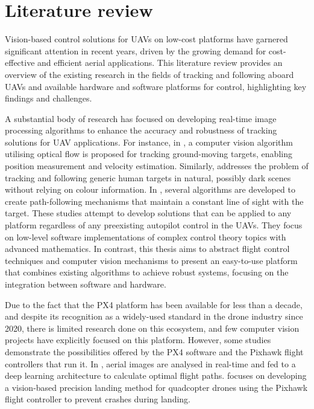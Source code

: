 \section{Literature review}
\label{sec:lit-review}



Vision-based control solutions for UAVs on low-cost platforms have garnered significant attention in recent years, driven by the growing demand for cost-effective and efficient aerial applications. This literature review provides an overview of the existing research in the fields of tracking and following aboard UAVs and available hardware and software platforms for control, highlighting key findings and challenges.

A substantial body of research has focused on developing real-time image processing algorithms to enhance the accuracy and robustness of tracking solutions for UAV applications. For instance, in \cite{gomez-balderas2012}, a computer vision algorithm utilising optical flow is proposed for tracking ground-moving targets, enabling position measurement and velocity estimation. Similarly, \cite{bevilacqua2016} addresses the problem of tracking and following generic human targets in natural, possibly dark scenes without relying on colour information. In \cite{rysdyk2003}, several algorithms are developed to create path-following mechanisms that maintain a constant line of sight with the target. These studies attempt to develop solutions that can be applied to any platform regardless of any preexisting autopilot control in the UAVs.
They focus on low-level software implementations of complex control theory topics with advanced mathematics.
In contrast, this thesis aims to abstract flight control techniques and computer vision mechanisms to present an easy-to-use platform that combines existing algorithms to achieve robust systems, focusing on the integration between software and hardware.

Due to the fact that the PX4 platform has been available for less than a decade, and despite its recognition as a widely-used standard in the drone industry since 2020, there is limited research done on this ecosystem, and few computer vision projects have explicitly focused on this platform. However, some studies demonstrate the possibilities offered by the PX4 software and the Pixhawk flight controllers that run it. In \cite{sizkouhi2022}, aerial images are analysed in real-time and fed to a deep learning architecture to calculate optimal flight paths. \cite{naufal2022} focuses on developing a vision-based precision landing method for quadcopter drones using the Pixhawk flight controller to prevent crashes during landing.

